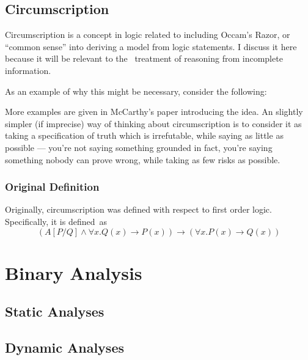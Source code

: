 
\subsection{Circumscription}
Circumscription is a concept in logic related to including Occam's Razor, or ``common sense'' into deriving a model from logic statements.
I discuss it here because it will be relevant to the \sysname\ treatment of reasoning from incomplete information.

As an example of why this might be necessary, consider the following:

More examples are given in McCarthy's paper introducing the idea.
An slightly simpler (if imprecise) way of thinking about circumscription is to consider it as taking a specification of truth which is irrefutable, while saying as little as possible --- you're not saying something grounded in fact, you're saying something nobody can prove wrong, while taking as few risks as possible.
\subsubsection{Original Definition}
Originally, circumscription was defined with respect to first order logic.
Specifically, it is defined\ as
\[
(A [P/Q] \wedge \forall x. Q(x) \rightarrow P(x)) \rightarrow (\forall x. P(x) \rightarrow Q(x))
\]
\section{Binary Analysis}
\subsection{Static Analyses}
\subsection{Dynamic Analyses}
